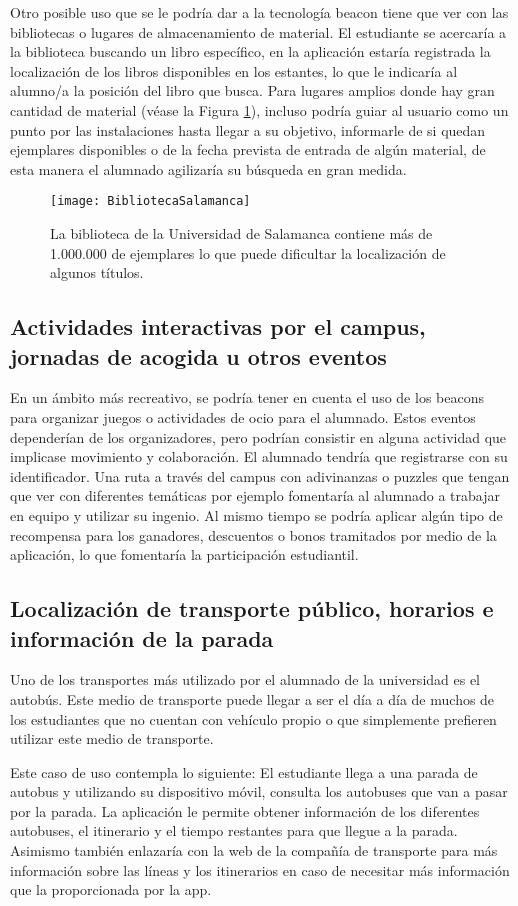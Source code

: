 Otro posible uso que se le podría dar a la tecnología beacon tiene que ver con las bibliotecas o lugares de almacenamiento de material. El estudiante se acercaría a la biblioteca buscando un libro específico, en la aplicación estaría registrada la localización de los libros disponibles en los estantes, lo que le indicaría al alumno/a la posición del libro que busca. Para lugares amplios donde hay gran cantidad de material (véase la Figura \ref{fig:bibliotecaUSAL}), incluso podría guiar al usuario como un punto por las instalaciones hasta llegar a su objetivo, informarle de si quedan ejemplares disponibles o de la fecha prevista de entrada de algún material, de esta manera el alumnado agilizaría su búsqueda en gran medida.

\begin{figure}[H]
	\centering
	\texttt{[image: BibliotecaSalamanca]}
	\caption{La biblioteca de la Universidad de Salamanca contiene más de 1.000.000 de ejemplares lo que puede dificultar la localización de algunos títulos.}
	\label{fig:bibliotecaUSAL}
\end{figure}

\subsection{Actividades interactivas por el campus, jornadas de acogida u otros eventos}

En un ámbito más recreativo, se podría tener en cuenta el uso de los beacons para organizar juegos o actividades de ocio para el alumnado. Estos eventos dependerían de los organizadores, pero podrían consistir en alguna actividad que implicase movimiento y colaboración. El alumnado tendría que registrarse con su identificador. Una ruta a través del campus con adivinanzas o puzzles que tengan que ver con diferentes temáticas por ejemplo fomentaría al alumnado a trabajar en equipo y utilizar su ingenio. Al mismo tiempo se podría aplicar algún tipo de recompensa para los ganadores, descuentos o bonos tramitados por medio de la aplicación, lo que fomentaría la participación estudiantil.

\subsection{Localización de transporte público, horarios e \\información de la parada}

Uno de los transportes más utilizado por el alumnado de la universidad es el autobús. Este medio de transporte puede llegar a ser el día a día de muchos de los estudiantes que no cuentan con vehículo propio o que simplemente prefieren utilizar este medio de transporte. 

Este caso de uso contempla lo siguiente: El estudiante llega a una parada de autobus y utilizando su dispositivo móvil, consulta los autobuses que van a pasar por la parada. La aplicación le permite obtener información de los diferentes autobuses, el itinerario y el tiempo restantes para que llegue a la parada.  Asimismo también enlazaría con la web de la compañía de transporte para más información sobre las líneas y los itinerarios en caso de necesitar más información que la proporcionada por la app.
